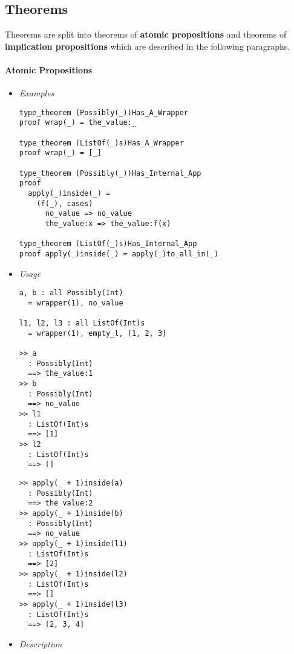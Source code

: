 \documentclass[diploma]{softlab-thesis}
\begin{document}
\newpage

\subsection{Theorems}
\label{subsubsec:ttheo}

Theorems are split into theorems of \textbf{atomic propositions} and
theorems of \textbf{implication propositions} which are described in the
following paragraphs.

\paragraph{Atomic Propositions}

\begin{itemize}
\item \textit{Examples}

\begin{verbatim}
type_theorem (Possibly(_))Has_A_Wrapper
proof wrap(_) = the_value:_

type_theorem (ListOf(_)s)Has_A_Wrapper
proof wrap(_) = [_]

type_theorem (Possibly(_))Has_Internal_App
proof
  apply(_)inside(_) =
    (f(_), cases)
      no_value => no_value
      the_value:x => the_value:f(x)

type_theorem (ListOf(_)s)Has_Internal_App
proof apply(_)inside(_) = apply(_)to_all_in(_)
\end{verbatim}

\item \textit{Usage}

\begin{verbatim}
a, b : all Possibly(Int)
  = wrapper(1), no_value

l1, l2, l3 : all ListOf(Int)s
  = wrapper(1), empty_l, [1, 2, 3]

>> a
  : Possibly(Int)
  ==> the_value:1
>> b
  : Possibly(Int)
  ==> no_value
>> l1
  : ListOf(Int)s
  ==> [1]
>> l2
  : ListOf(Int)s
  ==> []
\end{verbatim}
\newpage
\begin{verbatim}
>> apply(_ + 1)inside(a)
  : Possibly(Int)
  ==> the_value:2
>> apply(_ + 1)inside(b)
  : Possibly(Int)
  ==> no_value
>> apply(_ + 1)inside(l1)
  : ListOf(Int)s
  ==> [2]
>> apply(_ + 1)inside(l2)
  : ListOf(Int)s
  ==> []
>> apply(_ + 1)inside(l3)
  : ListOf(Int)s
  ==> [2, 3, 4]
\end{verbatim}

\item \textit{Description}


\end{itemize}
\end{document}

